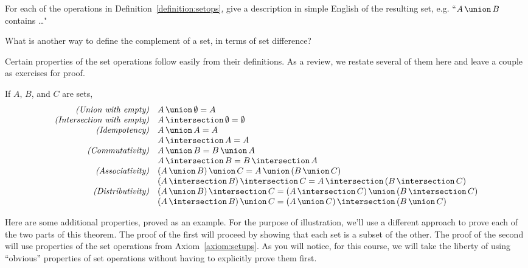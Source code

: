 \begin{exer}
For each of the operations in Definition~\ref{definition:setops}, give a description in simple English of the resulting set, e.g. ``$\setunion{A}{B}$ contains \ldots"
\end{exer}

\begin{exer}
What is another way to define the complement of a set, in terms of set difference?
\end{exer}

\begin{discussion}
Certain properties of the set operations follow easily from their definitions. As a review, we restate several of them here and leave a couple as exercises for proof. 
\end{discussion}

\begin{axiom}\label{axiom:setups}
If $A$, $B$, and $C$ are sets, 
\[\begin{array}{rl}
\textit{(Union with empty)}	& \setunion{A}{\emptyset} = A \\
\textit{(Intersection with empty)}	& \setintersection{A}{\emptyset} = \emptyset \\
\textit{(Idempotency)} 	& \setunion{A}{A} = A \\
					& \setintersection{A}{A} = A \\
\textit{(Commutativity)} 	& \setunion{A}{B} = \setunion{B}{A} \\
					&  \setintersection{A}{B} = \setintersection{B}{A} \\
\textit{(Associativity)}		& \setunion{(\setunion{A}{B})}{C} = \setunion{A}{(\setunion{B}{C})} \\
					& \setintersection{(\setintersection{A}{B})}{C} = \setintersection{A}{(\setintersection{B}{C})} \\
\textit{(Distributivity)}		& \setintersection{(\setunion{A}{B})}{C} = \setunion{(\setintersection{A}{C})}
															{(\setintersection{B}{C})} \\
					& \setunion{(\setintersection{A}{B})}{C} = \setintersection{(\setunion{A}{C})}
															{(\setunion{B}{C})} \\
\end{array}\]
\end{axiom}

\begin{discussion}
Here are some additional properties, proved as an example. For the purpose of illustration, we'll use a different approach to prove each of the two parts of this theorem. The proof of the first will proceed by showing that each set is a subset of the other. The proof of the second will use properties of the set operations from Axiom~\ref{axiom:setups}. As you will notice, for this course, we will take the liberty of using ``obvious'' properties of set operations without having to explicitly prove them first.
\end{discussion}

